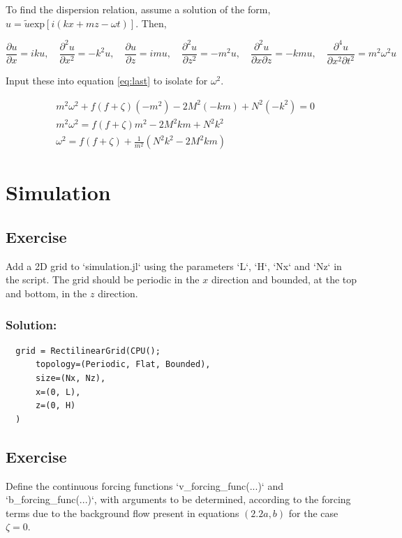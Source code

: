 \documentclass[12 pt]{article}
\numberwithin{equation}{section} %
\begin{document}
To find the dispersion relation, assume a solution of the form, $u=\tilde{u}\text{exp}[i(kx + mz - \omega t)]$. Then,

\begin{equation*}
  \frac{\partial u}{\partial x} = iku, \quad \frac{\partial^2 u}{\partial x^2} = -k^2u, \quad
  \frac{\partial u}{\partial z} = imu, \quad \frac{\partial^2 u}{\partial z^2} = -m^2u, \quad
  \frac{\partial^2 u}{\partial x \partial z} = -kmu, \quad \frac{\partial^4 u}{\partial x^2 \partial t^2} = m^2\omega^2 u
\end{equation*}

Input these into equation \ref{eq:last} to isolate for $\omega^2$.

\begin{align*}
  &m^2\omega^2 + f(f + \zeta)(-m^2) - 2M^2(-km) + N^2(-k^2) = 0 \\
  &m^2\omega^2 = f(f + \zeta)m^2 - 2M^2km + N^2k^2 \\
  &\omega^2 = f(f + \zeta) + \frac{1}{m^2} \left(N^2k^2 - 2M^2km\right)
\end{align*}


\section{Simulation}

\subsection{Exercise}
Add a 2D grid to `simulation.jl` using the parameters `L`, `H`, `Nx` and `Nz` in the script. The grid should be periodic in the $x$ direction and bounded, at the top and bottom, in the $z$ direction.

\subsubsection*{Solution:}
\begin{lstlisting}
  grid = RectilinearGrid(CPU();
      topology=(Periodic, Flat, Bounded),
      size=(Nx, Nz),
      x=(0, L),
      z=(0, H)
  )
\end{lstlisting}


\subsection{Exercise}
Define the continuous forcing functions `v\_forcing\_func(...)` and `b\_forcing\_func(...)`, with arguments to be determined, according to the forcing terms due to the background flow present in equations $(2.2a,b)$ for the case $\zeta = 0$.
\end{document}
